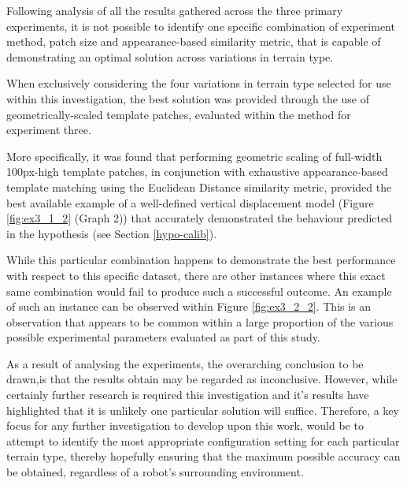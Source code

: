 Following analysis of all the results gathered across the three primary experiments, it is not possible to identify one specific combination of experiment method, patch size and appearance-based similarity metric, that is capable of demonstrating an optimal solution across variations in terrain type.


When exclusively considering the four variations in terrain type selected for use within this investigation, the best solution was provided through the use of geometrically-scaled template patches, evaluated within the method for experiment three.

More specifically, it was found that performing geometric scaling of full-width 100px-high template patches, in conjunction with exhaustive appearance-based template matching using the Euclidean Distance similarity metric, provided the best available example of a well-defined vertical displacement model (Figure \ref{fig:ex3_1_2} (Graph 2)) that accurately demonstrated the behaviour predicted in the hypothesis (see Section \ref{hypo-calib}).

While this particular combination happens to demonstrate the best performance with respect to this specific dataset, there are other instances where this exact same combination would fail to produce such a successful outcome. An example of such an instance can be observed within Figure \ref{fig:ex3_2_2}. This is an observation that appears to be common within a large proportion of the various possible experimental parameters evaluated as part of this study. 

As a result of analysing the experiments, the overarching conclusion to be drawn,is that the results obtain may be regarded as inconclusive. However, while certainly further research is required this investigation and it's results have highlighted that it is unlikely one particular solution will suffice. Therefore, a key focus for any further investigation to develop upon this work, would be to attempt to identify the most appropriate configuration setting for each particular terrain type, thereby hopefully ensuring that the maximum possible accuracy can be obtained, regardless of a robot's surrounding environment. 
  

 
  

